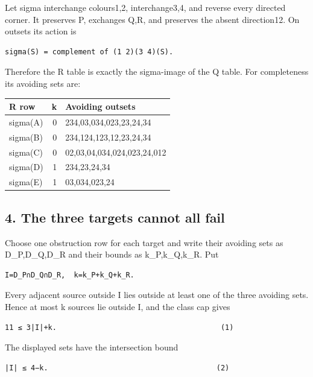 \documentclass[
  10pt,
]{article}
\begin{document}
Let sigma interchange colours1,2, interchange3,4, and reverse every
directed corner. It preserves P, exchanges Q,R, and preserves the absent
direction12. On outsets its action is

\begin{verbatim}
sigma(S) = complement of (1 2)(3 4)(S).
\end{verbatim}

Therefore the R table is exactly the sigma-image of the Q table. For
completeness its avoiding sets are:

\begin{longtable}[]{@{}lrl@{}}
\toprule\noalign{}
R row & k & Avoiding outsets \\
\midrule\noalign{}
\endhead
\bottomrule\noalign{}
\endlastfoot
sigma(A) & 0 & 234,03,034,023,23,24,34 \\
sigma(B) & 0 & 234,124,123,12,23,24,34 \\
sigma(C) & 0 & 02,03,04,034,024,023,24,012 \\
sigma(D) & 1 & 234,23,24,34 \\
sigma(E) & 1 & 03,034,023,24 \\
\end{longtable}

\hypertarget{the-three-targets-cannot-all-fail}{%
\subsection*{4. The three targets cannot all
fail}\label{the-three-targets-cannot-all-fail}}

Choose one obstruction row for each target and write their avoiding sets
as D\_P,D\_Q,D\_R and their bounds as k\_P,k\_Q,k\_R. Put

\begin{verbatim}
I=D_P∩D_Q∩D_R,  k=k_P+k_Q+k_R.
\end{verbatim}

Every adjacent source outside I lies outside at least one of the three
avoiding sets. Hence at most k sources lie outside I, and the class cap
gives

\begin{verbatim}
11 ≤ 3|I|+k.                                      (1)
\end{verbatim}

The displayed sets have the intersection bound

\begin{verbatim}
|I| ≤ 4−k.                                       (2)
\end{verbatim}
\end{document}
